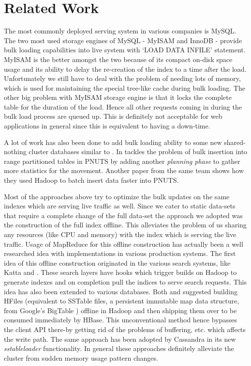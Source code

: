 \documentclass[10pt,twocolumn,preprint,natbib,authoryear]{sigplanconf}
\begin{document}
\section{Related Work}
\label{sec:related_work}
The most commonly deployed serving system in various companies is MySQL. The two most used storage engines of MySQL - MyISAM and InnoDB - provide bulk loading capabilities into live system with `LOAD DATA INFILE' statement. MyISAM is the better amongst the two because of its compact on-disk space usage and its ability to delay the re-creation of the index to a time after the load\cite{bulk}.  Unfortunately we still have to deal with the problem of needing lots of memory, which is used for maintaining the special tree-like cache during bulk loading. 
The other big problem with MyISAM storage engine is that it locks the complete table for the duration of the load. Hence all other requests coming in during the bulk load process are queued up. This is definitely not acceptable for web applications in general since this is equivalent to having a down-time.  

A lot of work has also been done to add bulk loading ability to some new shared-nothing cluster\cite{sharednothing} databases similar to \projectname{}. In \cite{silberstein} tackles the problem of bulk insertion into range partitioned tables in PNUTS \cite{pnuts} by adding another \emph {planning phase} to gather more statistics for the movement. Another paper from the same team \cite{pnutsbatch} shows how they used Hadoop to batch insert data faster into PNUTS.

Most of the approaches above try to optimize the bulk updates on the same indexes which are serving live traffic as well. Since we cater to static data-sets that require a complete change of the full data-set the approach we adopted was the construction of the full index offline. This alleviates the problem of us sharing any resources (like CPU and memory) with the index which is serving the live traffic. Usage of MapReduce for this offline construction has actually been a well researched idea with implementations in various production systems. The first idea of this offline construction originated in the various search systems, like Katta\cite{katta} and \cite{mika}. These search layers have hooks which trigger builds on Hadoop to generate indexes and on completion pull the indices to serve search requests. This idea has also been extended to various databases. Both \cite{konstantinou} and \cite{barbuzzi} suggested building HFiles (equivalent to SSTable files, a persistent immutable map data structure, from Google's BigTable \cite{bigtable}) offline in Hadoop and then shipping them over to be consumed immediately by HBase\cite{hbase}. This unconventional method hence bypasses the client API there-by getting rid of the problems of buffering, etc. which affects the write path. The same approach has been adopted by Cassandra\cite{cassandra} in its new \emph{sstableloader}\cite{cassandra_bulk} functionality. In general these approaches definitely alleviate the cluster from sudden memory usage pattern changes. 
\end{document}
